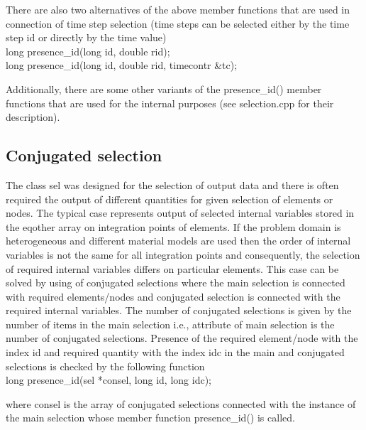 There are also two alternatives of the above member functions that are used in connection
of time step selection (time steps can be selected either by the time step id or
directly by the time value)\\

{\sf
  \indent \hspace{20mm} long presence\_id(long id, double rid);\\
  \indent \hspace{20mm} long presence\_id(long id, double rid, timecontr \&tc);\\
}

Additionally, there are some other variants of the {\sf presence\_id()} member functions
that are used for the internal purposes (see {\sf selection.cpp} for their description). 

\subsection {Conjugated selection} \label{consel}
The class {\sf sel} was designed for the selection of output data and there is often 
required the output of different quantities for given selection of elements 
or nodes. The typical case represents output of selected internal variables stored 
in the {\sf eqother} array on integration points of elements. If the problem domain 
is heterogeneous and different material models are used then the order of internal 
variables is not the same for all integration points and consequently, the selection of 
required internal variables differs on particular elements. This case can be solved by 
using of conjugated selections where the main selection is connected with required 
elements/nodes and conjugated selection is connected with the required internal 
variables. The number of conjugated selections is given by the number of items
in the main selection i.e., attribute {\sf } of main selection is the number of 
conjugated selections. Presence of the required element/node with the 
index {\sf id} and required quantity with the index {\sf idc} in the main and 
conjugated selections is checked by the following function\\

{\sf
  \indent \hspace{20mm} long presence\_id(sel *consel, long id, long idc);\\
}

where {\sf consel} is the array of conjugated selections connected with the instance 
of the main selection whose member function {\sf presence\_id()} is called.

